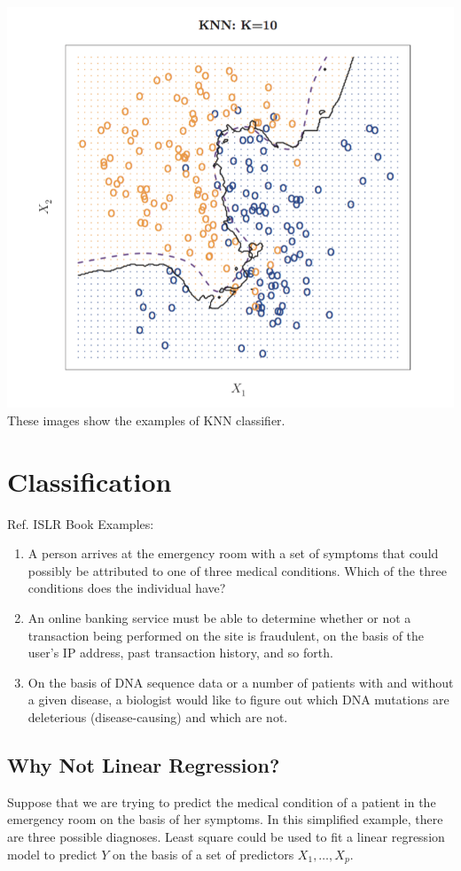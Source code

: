 \documentclass{article}
\begin{document}
\includegraphics[scale=0.8]{images/knn2.png} \\
These images show the examples of KNN classifier.



\section{Classification}
Ref. ISLR Book
Examples:
\begin{enumerate}
\item A person arrives at the emergency room with a set of symptoms that could possibly be attributed to one of three medical conditions. Which of the three conditions does the individual have?
\item An online banking service must be able to determine whether or not a transaction being performed on the site is fraudulent, on the basis of the user's IP address, past transaction history, and so forth.
\item On the basis of DNA sequence data or a number of patients with and without a given disease, a biologist would like to figure out which DNA mutations are deleterious (disease-causing) and which are not.
\end{enumerate}

\subsection{Why Not Linear Regression?}
Suppose that we are trying to predict the medical condition of a patient in the emergency room on the basis of her symptoms. In this simplified example, there are three possible diagnoses. Least square could be used to fit a linear regression model to predict $Y$ on the basis of a set of predictors $X_1, \ldots, X_p$.
\end{document}
